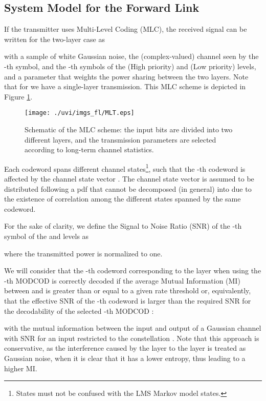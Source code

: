 \documentclass[journal,onecolumn,10pt,a4paper]{IEEEtran}
\begin{document}
\subsection{System Model for the Forward Link}

If the transmitter uses Multi-Level Coding (MLC), the received signal can be written for the two-layer case as

with  a sample of white Gaussian noise,   the (complex-valued) channel seen by the -th symbol,  and  the -th symbols of the  (High priority) and  (Low priority) levels, and  a parameter that weights the power sharing between the two layers. Note that for  we have a single-layer transmission. This MLC scheme is depicted in Figure \ref{f:MLT}.


\begin{figure}
\begin{center}

 \texttt{[image: ./uvi/imgs\_fl/MLT.eps]}
\caption{Schematic of the MLC scheme: the input bits are divided into two different layers, and the transmission parameters are selected according to long-term channel statistics.}
\label{f:MLT}\end{center}
\end{figure}

Each codeword spans  different channel states\footnote{States must not be confused with the LMS Markov model states.}, such that the -th codeword is affected by the channel state vector . The channel state vector  is assumed to be distributed following a pdf  that cannot be decomposed (in general) into  due to the existence of correlation among the different states spanned by the same codeword.

For the sake of clarity, we define the Signal to Noise Ratio (SNR) of the -th symbol of the  and  levels as

 where the transmitted power is normalized to one.


We will consider that the -th codeword corresponding to the  layer when using the -th MODCOD is correctly decoded if the average Mutual Information (MI) between  and  is greater than or equal to a given rate threshold or, equivalently, that the effective SNR  of the -th codeword is larger than the required SNR for the decodability of the selected -th MODCOD :

with  the mutual information between the input and output of a Gaussian channel with SNR  for an input restricted to the constellation . Note that this approach is conservative, as the interference caused by the  layer to the  layer is treated as Gaussian noise, when it is clear that it has a lower entropy, thus leading to a higher MI.
\end{document}
